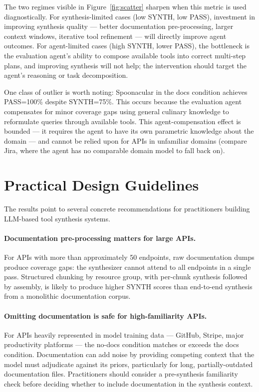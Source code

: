 \documentclass[12pt]{report}
\begin{document}
The two regimes visible in Figure~\ref{fig:scatter} sharpen when this
metric is used diagnostically. For synthesis-limited cases (low SYNTH, low
PASS), investment in improving synthesis quality --- better documentation
pre-processing, larger context windows, iterative tool refinement --- will
directly improve agent outcomes. For agent-limited cases (high SYNTH, lower
PASS), the bottleneck is the evaluation agent's ability to compose available
tools into correct multi-step plans, and improving synthesis will not help;
the intervention should target the agent's reasoning or task decomposition.

One class of outlier is worth noting: Spoonacular in the docs condition
achieves PASS=100\% despite SYNTH=75\%. This occurs because the evaluation
agent compensates for minor coverage gaps using general culinary knowledge
to reformulate queries through available tools. This agent-compensation
effect is bounded --- it requires the agent to have its own parametric
knowledge about the domain --- and cannot be relied upon for APIs in
unfamiliar domains (compare Jira, where the agent has no comparable domain
model to fall back on).

\section{Practical Design Guidelines}

The results point to several concrete recommendations for practitioners
building LLM-based tool synthesis systems.

\paragraph{Documentation pre-processing matters for large APIs.}
For APIs with more than approximately 50 endpoints, raw documentation dumps
produce coverage gaps: the synthesizer cannot attend to all endpoints in a
single pass. Structured chunking by resource group, with per-chunk synthesis
followed by assembly, is likely to produce higher SYNTH scores than
end-to-end synthesis from a monolithic documentation corpus.

\paragraph{Omitting documentation is safe for high-familiarity APIs.}
For APIs heavily represented in model training data --- GitHub, Stripe,
major productivity platforms --- the no-docs condition matches or exceeds
the docs condition. Documentation can add noise by providing competing
context that the model must adjudicate against its priors, particularly
for long, partially-outdated documentation files. Practitioners should
consider a pre-synthesis familiarity check before deciding whether to
include documentation in the synthesis context.
\end{document}

